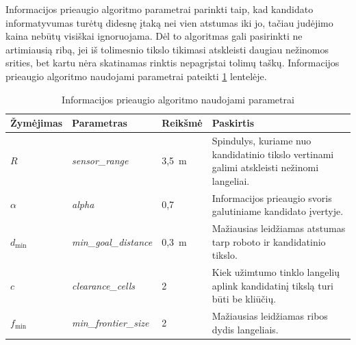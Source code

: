 \documentclass[]{VUMIFTemplateClass}
\begin{document}
Informacijos prieaugio algoritmo parametrai parinkti taip, kad kandidato informatyvumas turėtų didesnę įtaką nei vien atstumas iki jo, tačiau judėjimo kaina
nebūtų visiškai ignoruojama. Dėl to algoritmas gali pasirinkti ne artimiausią ribą, jei iš tolimesnio tikslo tikimasi atskleisti daugiau nežinomos srities, bet
kartu nėra skatinamas rinktis nepagrįstai tolimų taškų. Informacijos prieaugio algoritmo naudojami parametrai pateikti \ref{tab:info-gain-pseudocode-params}
lentelėje.

\begin{table}[H]
\centering
\caption{Informacijos prieaugio algoritmo naudojami parametrai}
\label{tab:info-gain-pseudocode-params}
\small
\begin{tabular}{|p{1.8cm}|p{3.8cm}|p{2.1cm}|p{6.2cm}|}
\hline
\textbf{Žymėjimas} & \textbf{Parametras} & \textbf{Reikšmė} & \textbf{Paskirtis} \\
\hline
$R$ & \textit{sensor\_range} & 3,5~m & Spindulys, kuriame nuo kandidatinio tikslo vertinami galimi atskleisti nežinomi langeliai. \\
\hline
$\alpha$ & \textit{alpha} & 0,7 & Informacijos prieaugio svoris galutiniame kandidato įvertyje. \\
\hline
$d_{\min}$ & \textit{min\_goal\_distance} & 0,3~m & Mažiausias leidžiamas atstumas tarp roboto ir kandidatinio tikslo. \\
\hline
$c$ & \textit{clearance\_cells} & 2 & Kiek užimtumo tinklo langelių aplink kandidatinį tikslą turi būti be kliūčių. \\
\hline
$f_{\min}$ & \textit{min\_frontier\_size} & 2 & Mažiausias leidžiamas ribos dydis langeliais. \\
\hline
\end{tabular}
\end{table}
\end{document}

